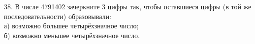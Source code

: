 38. В числе 4791402 зачеркните 3 цифры так, чтобы оставшиеся цифры (в той же последовательности) образовывали:\\
а) возможно большее четырёхзначное число;\\
б) возможно меньшее четырёхзначное число.\\
